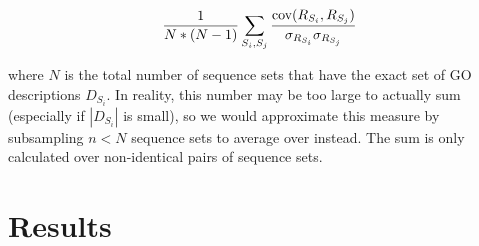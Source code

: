 \documentclass{specification}
\begin{document}
\[\frac{1}{N*(N-1)}\sum_{S_i, S_j} \frac{\textnormal{cov}(R_{S_i}, R_{S_j})}{\sigma_{R_{S_i}}\sigma_{R_{S_j}}}\]

where $N$ is the total number of sequence sets that have the exact set of GO descriptions $D_{S_i}$. In reality, this number may be too large to actually sum (especially if $|D_{S_i}|$ is small), so we would approximate this measure by subsampling $n < N$ sequence sets to average over instead. The sum is only calculated over non-identical pairs of sequence sets.

%
%
%
%
%


%
%



\section{Results}
\end{document}
